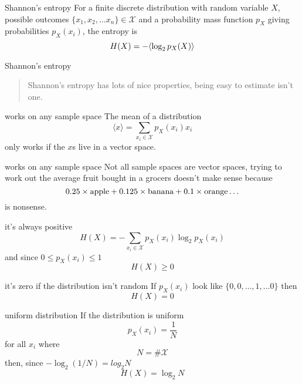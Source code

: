 \documentclass{beamer}
\newcommand{\crish}{\color{reddish}}
\newcommand{\cbla}{\color{black}}
\newcommand{\cblu}{\color{blue}}
\newcommand{\sm}{\color{reddish}$}
\newcommand{\fm}{$\color{black}{}}
\begin{document}
\begin{frame}{Shannon's entropy}
  For a finite discrete distribution with random variable \sm X\fm,
  possible outcomes \sm\{x_1,x_2,\ldots x_n\}\in\mathcal{X}\fm{} and a
  probability mass function \sm p_X\fm{} giving probabilities \sm p_X(x_i)\fm, the
  entropy is
\crish
  $$
H(X)=-\cblu\langle\crish \log_2{p_X(X)}\cblu\rangle\crish
  $$
\cbla
\end{frame}


\begin{frame}{Shannon's entropy}
  \begin{quote}
    Shannon's entropy has lots of nice properties, being easy to estimate isn't one.
  \end{quote}
\end{frame}

\begin{frame}{works on any sample space}
The mean of a distribution
\crish
$$
\langle x\rangle = \sum_{x_i\in \mathcal{X}}{p_X(x_i)x_i}
$$
\cbla
only works if the \sm x\fm s live in a vector space. 
  \end{frame}


\begin{frame}{works on any sample space}
Not all sample spaces are vector spaces, trying to work out the average fruit bought in a grocers doesn't make sense because
\crish
$$
0.25\times \mbox{\color{green}apple\crish}+0.125\times \mbox{\color{yellow}banana\crish}+0.1\times \mbox{\color{orange}orange\crish}\ldots
$$ \cbla is nonsense.
  \end{frame}


\begin{frame}{it's always positive}
\crish
  $$
H(X)=-\sum_{x_i\in \mathcal{X}}{p_X(x_i)\log_2p_X(x_i)}
$$
\cbla
 and since \sm 0\le p_X(x_i)\le 1 \fm 
 \crish
 $$
 H(X)\ge 0
 $$
 \cbla
\end{frame}

\begin{frame}{it's zero if the distribution isn't random}
  If \sm p_X(x_i)\fm{} look like \sm\{0,0,\dots,1,\ldots 0\}\fm{} then
\crish
 $$
 H(X)= 0
 $$
 \cbla
\end{frame}

\begin{frame}{uniform distribution}
  If the distribution is uniform
  \crish
  $$
  p_X(x_i)=\frac{1}{N}
$$
  \cbla
  for all \sm x_i\fm{} where
    \crish
  $$
  N=\#\mathcal{X}
$$
  \cbla
then, since \sm-\log_2(1/N)=log_2{N}\fm{}  
 \crish
 $$
 H(X)=\log_2{N}
 $$
 \cbla
\end{frame}
\end{document}
